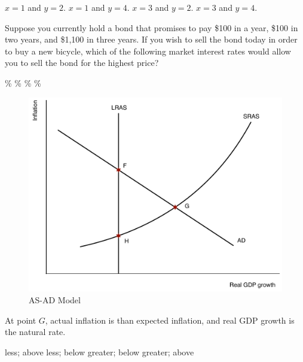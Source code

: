 \documentclass[addpoints,11pt]{exam}
\theoremstyle{definition}
\newcommand{\blank}[0]{\underline{\hspace{3cm}}}
\begin{document}
\begin{questions}
\begin{choices}
	\choice $x=1$ and $y=2$.
	\CorrectChoice $x=1$ and $y=4$.
	\choice $x=3$ and $y=2$.
	\choice $x=3$ and $y=4$.
\end{choices}

\question Suppose you currently hold a bond that promises to pay \$100 in a year, \$100 in two years, and \$1,100 in three years. If you wish to sell the bond today in order to buy a new bicycle, which of the following market interest rates would allow you to sell the bond for the highest price?
\begin{choices}
	\%
	\%
	\%
	\%
\end{choices}





	\begin{figure}[H]
		\centering
		\includegraphics[scale=.38]{Final_MC14.pdf}
		\caption{AS-AD Model}
		\label{MC14}
	\end{figure}
	
	\question \label{q14} At point $G$, actual inflation is \blank than expected inflation, and real GDP growth is \blank the natural rate.
	
	\begin{choices}
		\choice less; above 
		\choice less; below
		\choice greater; below
		\CorrectChoice greater; above
	\end{choices}
	

\end{questions}
\end{document}
